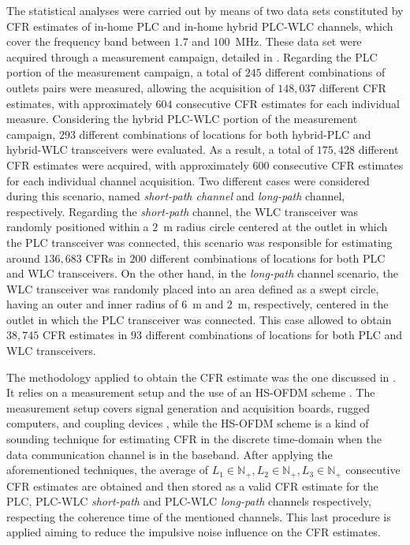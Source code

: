 \documentclass[journal]{IEEEtran}
\begin{document}
The statistical analyses were carried out by means of two data sets constituted by \ac{CFR} estimates of in-home \ac{PLC} and in-home hybrid \ac{PLC}-\ac{WLC} channels, which cover the frequency band between $1.7$ and $100$~MHz. These data set were acquired through a measurement campaign, detailed in \cite{Thiago:Characterization,thiago:hyb}. Regarding the \ac{PLC} portion of the measurement campaign, a total of $245$ different combinations of outlets pairs were measured, allowing the acquisition of $148,037$ different \ac{CFR} estimates, with approximately $604$ consecutive \ac{CFR} estimates for each individual measure. Considering the hybrid \ac{PLC}-\ac{WLC} portion of the measurement campaign, $293$ different combinations of locations for both hybrid-\ac{PLC} and hybrid-\ac{WLC} transceivers were evaluated. As a result, a total of $175,428$ different \ac{CFR} estimates were acquired, with approximately $600$ consecutive \ac{CFR} estimates for each individual channel acquisition. Two different cases were considered during this scenario, named \textit{short-path channel} and \textit{long-path} channel, respectively. Regarding the \textit{short-path} channel, the \ac{WLC} transceiver was randomly positioned within a $2$~m radius circle centered at the outlet in which the \ac{PLC} transceiver was connected, this scenario was responsible for estimating around $136,683$ \acp{CFR} in $200$ different combinations of locations for both \ac{PLC} and \ac{WLC} transceivers. On the other hand, in the \textit{long-path} channel scenario, the \ac{WLC} transceiver was randomly placed into an area defined as a swept circle, having an outer and inner radius of $6$~m and $2$~m, respectively, centered in the outlet in which the \ac{PLC} transceiver was connected. This case allowed to obtain $38,745$ \ac{CFR} estimates in $93$ different combinations of locations for both \ac{PLC} and \ac{WLC} transceivers.

The methodology applied to obtain the \ac{CFR} estimate was the one discussed in \cite{Thiago:FR}. It relies on a measurement setup and the use of an \ac{HS-OFDM} scheme \cite{HSOFDM,Picorone}. The measurement setup covers signal generation and acquisition boards, rugged computers, and coupling devices \cite{Luis:AI,Coupling:PLC}, while the \ac{HS-OFDM} scheme is a kind of sounding technique for estimating \ac{CFR} in the discrete time-domain when the data communication channel is in the baseband. After applying the aforementioned techniques, the average of $L_1\in \mathbb{N}_+, L_2\in \mathbb{N}_+, L_3\in \mathbb{N}_+ $ consecutive \ac{CFR} estimates are obtained and then stored as a valid \ac{CFR} estimate for the \ac{PLC}, \ac{PLC}-\ac{WLC} \textit{short-path} and \ac{PLC}-\ac{WLC} \textit{long-path} channels respectively, respecting the coherence time of the mentioned channels. This last procedure is applied aiming to reduce the impulsive noise influence on the \ac{CFR} estimates.
\end{document}
